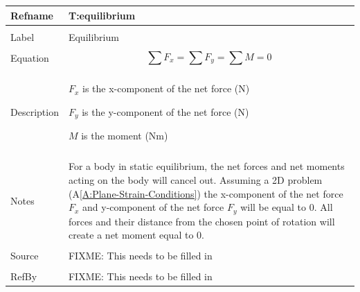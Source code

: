 \documentclass[12pt]{article}
\begin{document}
\noindent \begin{minipage}{\textwidth}
\begin{tabular}{p{} p{}}
\toprule \textbf{Refname} & \textbf{T:equilibrium}
\label{T:equilibrium}
\\ \midrule \\
Label & Equilibrium
\\ \midrule \\
Equation & \begin{dmath}
           \displaystyle\sum{{F_{x}}}=\displaystyle\sum{{F_{y}}}=\displaystyle\sum{M}=0
           \end{dmath}
\\ \midrule \\
Description & \begin{symbDescription}
              \item{${F_{x}}$ is the x-component of the net force (N)}
              \item{${F_{y}}$ is the y-component of the net force (N)}
              \item{$M$ is the moment (Nm)}
              \end{symbDescription}
\\ \midrule \\
Notes & For a body in static equilibrium, the net forces and net moments acting on the body will cancel out. Assuming a 2D problem (A\ref{A:Plane-Strain-Conditions}) the x-component of the net force ${F_{x}}$ and y-component of the net force ${F_{y}}$ will be equal to $0$. All forces and their distance from the chosen point of rotation will create a net moment equal to $0$.
\\ \midrule \\
Source & FIXME: This needs to be filled in
\\ \midrule \\
RefBy & FIXME: This needs to be filled in
\\ \bottomrule \end{tabular}
\end{minipage}\\
~\newline
\end{document}
